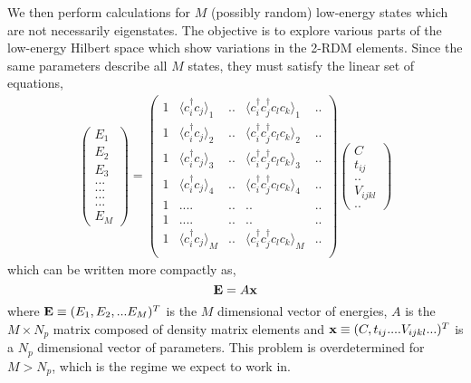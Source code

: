 \documentclass[aip,jcp,twocolumn,10pt]{revtex4-1}
\begin{document}
We then perform calculations for 
$M$ (possibly random) low-energy states which are not necessarily eigenstates.  
The objective is to explore various parts 
of the low-energy Hilbert space which show variations in the 2-RDM elements. 
Since the same parameters describe all $M$ states, they must 
satisfy the linear set of equations, 
\begin{eqnarray}
\left(
\begin{array}{c}
E_1 \\
E_2 \\
E_3 \\
... \\
... \\
... \\
... \\
E_M
\end{array}
\right) =
\left(
\begin{array}{ccccc}
1 & \langle c_i^{\dagger}c_j \rangle_{1}  & .. & \langle c_i^{\dagger}c_j^{\dagger}c_l c_k \rangle_{1} & .. \\
1 & \langle c_i^{\dagger}c_j \rangle_{2}  & .. & \langle c_i^{\dagger}c_j^{\dagger}c_l c_k \rangle_{2} & .. \\
1 & \langle c_i^{\dagger}c_j \rangle_{3}  & .. & \langle c_i^{\dagger}c_j^{\dagger}c_l c_k \rangle_{3} & .. \\
1 & \langle c_i^{\dagger}c_j \rangle_{4}  & .. & \langle c_i^{\dagger}c_j^{\dagger}c_l c_k \rangle_{4} & .. \\
1 & ....                                  & .. & ..                                                    & .. \\
1 & ....                                  & .. & ..                                                    & .. \\
1 & \langle c_i^{\dagger}c_j \rangle_{M}  & .. & \langle c_i^{\dagger}c_j^{\dagger}c_l c_k \rangle_{M} & .. \\
\end{array}
\right) \left(
\begin{array}{c}
C           \\
t_{ij}      \\
..          \\
V_{ijkl}    \\
..
\end{array}
\right)
\end{eqnarray}
which can be written more compactly as,
\begin{equation}
	{\bf{E}} = A {\bf{x}}
\end{equation}
where $ {\bf{E}} \equiv (E_1,E_2,...E_M)^{T}$ 
is the $M$ dimensional vector of energies, $A$ is the $M \times N_p$ matrix composed 
of density matrix elements and $ {\bf{x}} \equiv (C,t_{ij}....V_{ijkl}...)^T$ 
is a $N_p$ dimensional vector of parameters.
This problem is overdetermined for $M>N_p$, which is the regime we expect to work in.
\end{document}
